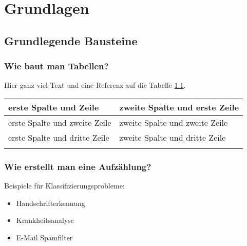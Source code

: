 \chapter{Grundlagen}
\section{Grundlegende Bausteine}

\subsection{Wie baut man Tabellen?}

Hier ganz viel Text und eine Referenz auf die Tabelle \ref{tab:heisetabelle}. 
\begin{table}[h]
	\begin{tabular}[h]{|l|p{7cm}|}
	    \hline
		erste Spalte und Zeile & zweite Spalte und erste Zeile \\
		\hline
		erste Spalte und zweite Zeile & zweite Spalte und zweite Zeile \\
		erste Spalte und dritte Zeile & zweite Spalte und dritte Zeile \\
		\label{tab:heisetabelle}
	\end{tabular}
\end{table}

\subsection{Wie erstellt man eine Aufzählung?}

Beispiele für Klassifizierungsprobleme:
\begin{itemize}
    \item Handschrifterkennung
    \item Krankheitsanalyse
    \item E-Mail Spamfilter
\end{itemize}

